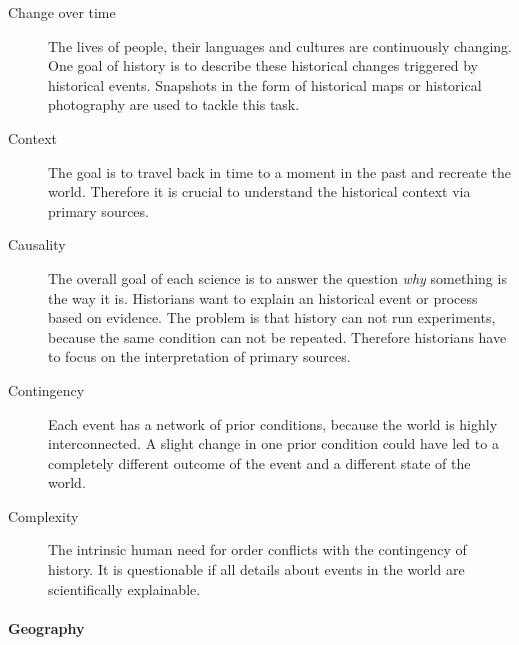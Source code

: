 \vspace{-1em}
\begin{description} %
  \item[Change over time]
  The lives of people, their languages and cultures are continuously changing. One goal of history is to describe these historical changes triggered by historical events. Snapshots in the form of historical maps or historical photography are used to tackle this task.
  \item[Context] The goal is to travel back in time to a moment in the past and recreate the world. Therefore it is crucial to understand the historical context via primary sources.
  \item[Causality]
  The overall goal of each science is to answer the question \emph{why} something is the way it is. Historians want to explain an historical event or process based on evidence. The problem is that history can not run experiments, because the same condition can not be repeated. Therefore historians have to focus on the interpretation of primary sources.
  \item[Contingency]
  Each event has a network of prior conditions, because the world is highly interconnected. A slight change in one prior condition could have led to a completely different outcome of the event and a different state of the world.
  \item[Complexity]
  The intrinsic human need for order conflicts with the contingency of history. It is questionable if all details about events in the world are scientifically explainable.
\end{description}

\paragraph{Geography} %
\label{par:geography}

